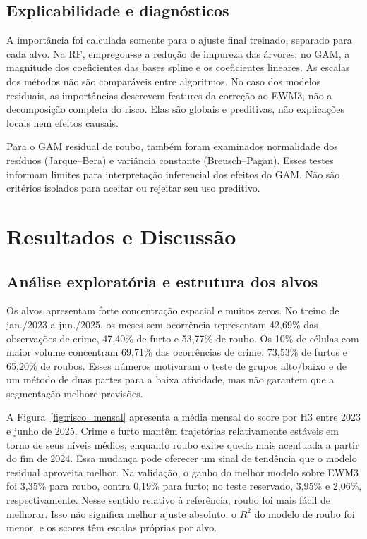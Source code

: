 \documentclass[12pt]{article}
\begin{document}
\subsection{Explicabilidade e diagnósticos}

A importância foi calculada somente para o ajuste final treinado, separado para cada alvo. Na RF, empregou-se a redução de impureza das árvores; no GAM, a magnitude dos coeficientes das bases spline e os coeficientes lineares. As escalas dos métodos não são comparáveis entre algoritmos. No caso dos modelos residuais, as importâncias descrevem features da correção ao EWM3, não a decomposição completa do risco. Elas são globais e preditivas, não explicações locais nem efeitos causais.

Para o GAM residual de roubo, também foram examinados normalidade dos resíduos (Jarque--Bera) e variância constante (Breusch--Pagan). Esses testes informam limites para interpretação inferencial dos efeitos do GAM. Não são critérios isolados para aceitar ou rejeitar seu uso preditivo.

\section{Resultados e Discussão}

\subsection{Análise exploratória e estrutura dos alvos}

Os alvos apresentam forte concentração espacial e muitos zeros. No treino de jan./2023 a jun./2025, os meses sem ocorrência representam 42,69\% das observações de crime, 47,40\% de furto e 53,77\% de roubo. Os 10\% de células com maior volume concentram 69,71\% das ocorrências de crime, 73,53\% de furtos e 65,20\% de roubos. Esses números motivaram o teste de grupos alto/baixo e de um método de duas partes para a baixa atividade, mas não garantem que a segmentação melhore previsões.

A Figura~\ref{fig:risco_mensal} apresenta a média mensal do score por H3 entre 2023 e junho de 2025. Crime e furto mantêm trajetórias relativamente estáveis em torno de seus níveis médios, enquanto roubo exibe queda mais acentuada a partir do fim de 2024. Essa mudança pode oferecer um sinal de tendência que o modelo residual aproveita melhor. Na validação, o ganho do melhor modelo sobre EWM3 foi 3,35\% para roubo, contra 0,19\% para furto; no teste reservado, 3,95\% e 2,06\%, respectivamente. Nesse sentido relativo à referência, roubo foi mais fácil de melhorar. Isso não significa melhor ajuste absoluto: o $R^2$ do modelo de roubo foi menor, e os scores têm escalas próprias por alvo.
\end{document}
